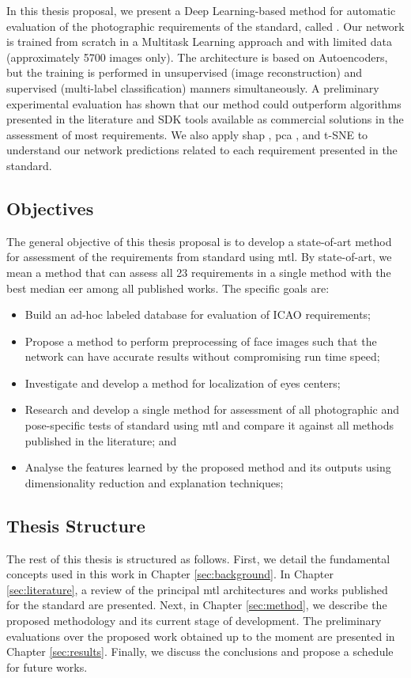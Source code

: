 In this thesis proposal, we present a Deep Learning-based method for automatic evaluation of the photographic requirements of the \icao standard, called \methodname. Our network is trained from scratch in a Multitask Learning approach and with limited data (approximately 5700 images only). The architecture is based on Autoencoders, but the training is performed in unsupervised (image reconstruction) and supervised (multi-label classification) manners simultaneously. A preliminary experimental evaluation has shown that our method could outperform algorithms presented in the literature and SDK tools available as commercial solutions in the assessment of most requirements. We also apply \acf{shap} \citep{shap2018}, \acf{pca} \citep{pca}, and t-SNE \citep{tsne} to understand our network predictions related to each requirement presented in the \icao standard.

\subsection{Objectives}	

The general objective of this thesis proposal is to develop a state-of-art method for assessment of the requirements from \icao standard using \acl{mtl}. By state-of-art, we mean a method that can assess all 23 requirements in a single method with the best median \acs{eer} among all published works. The specific goals are:

\begin{itemize}
\item Build an ad-hoc labeled database for evaluation of ICAO requirements;
\item Propose a method to perform preprocessing of face images such that the network can have accurate results without compromising run time speed;
\item Investigate and develop a method for localization of eyes centers;
\item Research and develop a single method for assessment of all photographic and pose-specific tests of \icao standard using \acf{mtl} and compare it against all methods published in the literature; and
\item Analyse the features learned by the proposed method and its outputs using dimensionality reduction and explanation techniques;
\end{itemize}

\subsection{Thesis Structure}

The rest of this thesis is structured as follows. First, we detail the fundamental concepts used in this work in Chapter \ref{sec:background}. In Chapter \ref{sec:literature}, a review of the principal \acl{mtl} architectures and works published for the \icao standard are presented. Next, in Chapter \ref{sec:method}, we describe the proposed methodology and its current stage of development. The preliminary evaluations over the proposed work obtained up to the moment are presented in Chapter \ref{sec:results}. Finally, we discuss the conclusions and propose a schedule for future works.
